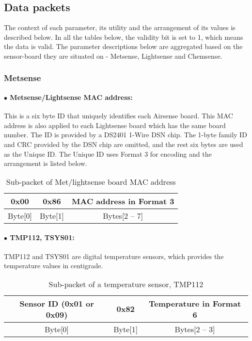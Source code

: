\subsection{Data packets}
The context of each parameter, its utility and the arrangement of its values is described below. In all
the tables below, the validity bit is set to 1, which means the data is valid. The parameter descriptions
below are aggregated based on the sensor-board they are situated on -
Metsense, Lightsense and Chemsense.

\subsubsection{Metsense}

\paragraph{$\bullet$ Metsense/Lightsense MAC address: }

This is a six byte ID that uniquely identifies each Airsense board. This MAC address is also applied to each Lightsense board which has the same board number. The ID is provided by a DS2401 1-Wire DSN chip. The 1-byte family ID and CRC provided by the DSN chip are omitted, and the rest six bytes are used as the Unique ID. The Unique ID uses Format 3 for encoding and the arrangement is listed below.
\\

\begin{table}[h!]
    \centering
    \caption{Sub-packet of Met/lightsense board MAC address}
    \begin{tabular}{|c|c|c|}
        \hline
        \rowcolor{black!8}
        \textbf{0x00} & \textbf{0x86} & \textbf{MAC address in Format 3} \\
        \hline
        Byte[0] & Byte[1] & Bytes[2 -- 7]\\ \hline
    \end{tabular}
\end{table}
\par

\paragraph{$\bullet$ TMP112, TSYS01:}

TMP112 and TSYS01 are digital temperature sensors, which provides the temperature values
in centigrade.

\begin{table}[h!]
    \centering
    \caption{Sub-packet of a temperature sensor, TMP112}
    \begin{tabular}{|c|c|c|}
        \hline
        \rowcolor{black!8}
        \textbf{Sensor ID} (0x01 or 0x09) & \textbf{0x82} & \textbf{Temperature in Format 6} \\
        \hline
        Byte[0] & Byte[1] & Bytes[2 -- 3]\\ \hline
    \end{tabular}
\end{table}



